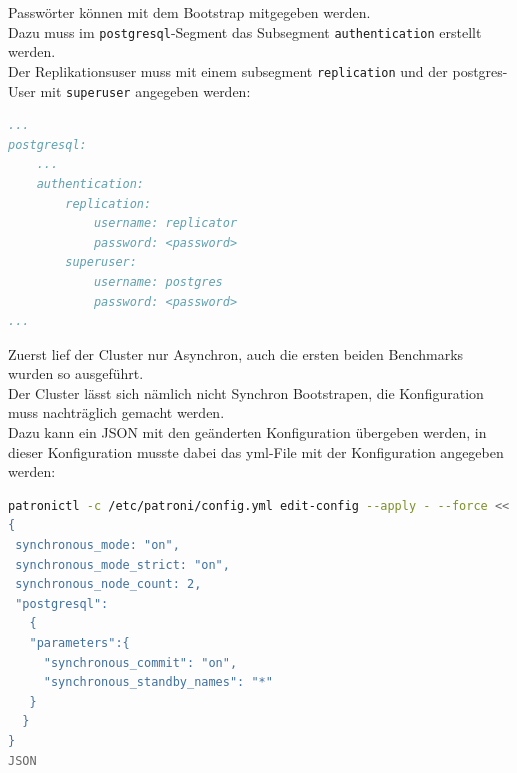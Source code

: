 \begin{flushleft}
    Passwörter können mit dem Bootstrap mitgegeben werden.\\
    Dazu muss im \texttt{postgresql}-Segment das Subsegment \texttt{authentication} erstellt werden.\\
    Der Replikationsuser muss mit einem subsegment \texttt{replication} und der postgres-User mit \texttt{superuser} angegeben werden:
\lstset{style=gra_codestyle}
\begin{lstlisting}[language=yaml, caption=Patroni - Passwörter,captionpos=b,label={lst:patroni_passwords},breaklines=true]
...
postgresql:
    ...
    authentication:
        replication:
            username: replicator
            password: <password>
        superuser:
            username: postgres
            password: <password>
...
\end{lstlisting}
\end{flushleft}
\begin{flushleft}
    Zuerst lief der Cluster nur Asynchron, auch die ersten beiden Benchmarks wurden so ausgeführt.\\
    Der Cluster lässt sich nämlich nicht Synchron Bootstrapen, die Konfiguration muss nachträglich gemacht werden.\\
    Dazu kann ein JSON mit den geänderten Konfiguration übergeben werden, in dieser Konfiguration musste dabei das yml-File mit der Konfiguration angegeben werden:
\lstset{style=gra_codestyle}
\begin{lstlisting}[language=bash, caption=Patroni - Synchrone Replikation setzen,captionpos=b,label={lst:patroni_set_sync_replication},breaklines=true]
patronictl -c /etc/patroni/config.yml edit-config --apply - --force <<'JSON'
{
 synchronous_mode: "on",
 synchronous_mode_strict: "on",
 synchronous_node_count: 2,
 "postgresql":
   {
   "parameters":{
     "synchronous_commit": "on",
     "synchronous_standby_names": "*"
   }
  }
}
JSON
\end{lstlisting}
\end{flushleft}